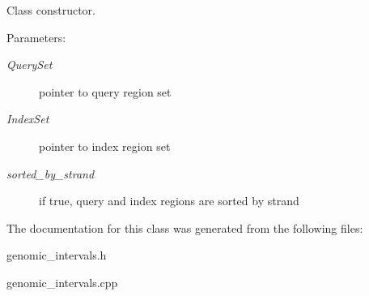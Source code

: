 Class constructor. 

\begin{Desc}
\item[Parameters:]
\begin{description}
\item[{\em QuerySet}]pointer to query region set \item[{\em IndexSet}]pointer to index region set \item[{\em sorted\_\-by\_\-strand}]if true, query and index regions are sorted by strand \end{description}
\end{Desc}


The documentation for this class was generated from the following files:\begin{CompactItemize}
\item 
genomic\_\-intervals.h\item 
genomic\_\-intervals.cpp\end{CompactItemize}
